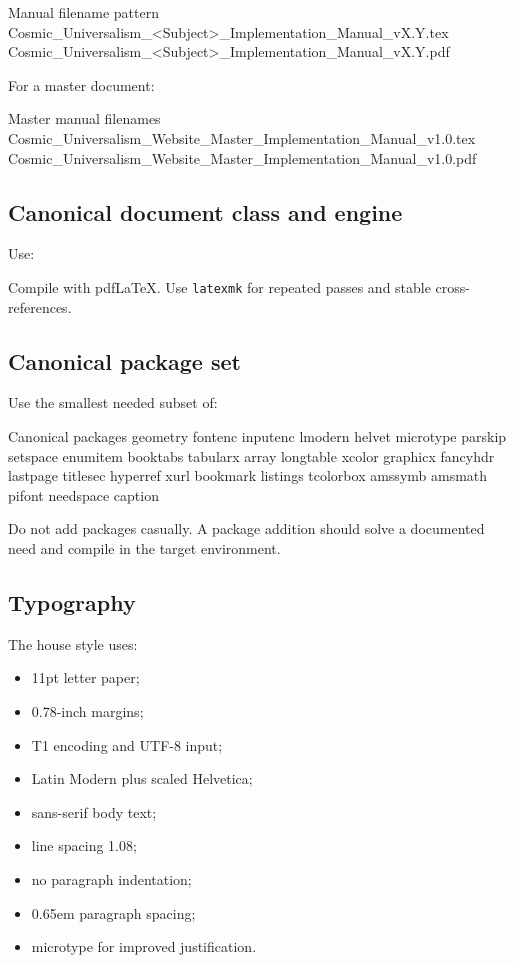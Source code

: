 \documentclass[11pt,letterpaper]{article}
\begin{document}
\begin{codebox}{Manual filename pattern}
Cosmic_Universalism_<Subject>_Implementation_Manual_vX.Y.tex
Cosmic_Universalism_<Subject>_Implementation_Manual_vX.Y.pdf
\end{codebox}

For a master document:

\begin{codebox}{Master manual filenames}
Cosmic_Universalism_Website_Master_Implementation_Manual_v1.0.tex
Cosmic_Universalism_Website_Master_Implementation_Manual_v1.0.pdf
\end{codebox}

\subsection{Canonical document class and engine}

Use:


Compile with pdfLaTeX. Use \texttt{latexmk} for repeated passes and stable
cross-references.

\subsection{Canonical package set}

Use the smallest needed subset of:

\begin{codebox}{Canonical packages}
geometry
fontenc
inputenc
lmodern
helvet
microtype
parskip
setspace
enumitem
booktabs
tabularx
array
longtable
xcolor
graphicx
fancyhdr
lastpage
titlesec
hyperref
xurl
bookmark
listings
tcolorbox
amssymb
amsmath
pifont
needspace
caption
\end{codebox}

Do not add packages casually. A package addition should solve a documented
need and compile in the target environment.

\subsection{Typography}

The house style uses:

\begin{itemize}
    \item 11pt letter paper;
    \item 0.78-inch margins;
    \item T1 encoding and UTF-8 input;
    \item Latin Modern plus scaled Helvetica;
    \item sans-serif body text;
    \item line spacing 1.08;
    \item no paragraph indentation;
    \item 0.65em paragraph spacing;
    \item microtype for improved justification.
\end{itemize}
\end{document}
